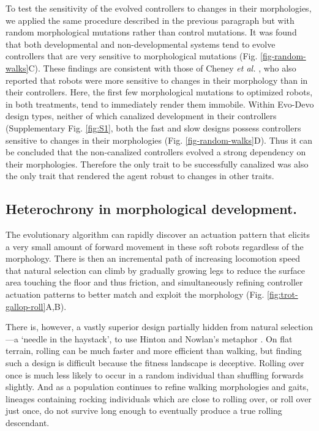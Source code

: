 To test the sensitivity of the evolved controllers to changes in their morphologies, we applied the same procedure described in the previous paragraph but with random morphological mutations rather than control mutations.
It was found that both developmental and non-developmental systems tend to evolve controllers that are very sensitive to morphological mutations (Fig. \ref{fig-random-walks}C).
These findings are consistent with those of Cheney \textit{et al.} \cite{cheney2017scalable}, who also reported that robots were more sensitive to changes in their morphology than in their controllers.
Here, the first few morphological mutations to optimized robots, in both treatments, tend to immediately render them immobile.
Within Evo-Devo design types, neither of which canalized development in their controllers (Supplementary Fig. \ref{fig:S1},%
both the fast and slow designs possess controllers sensitive to changes in their morphologies (Fig. \ref{fig-random-walks}D).
Thus it can be concluded that the non-canalized controllers evolved a strong dependency on their morphologies. 
Therefore the only trait to be successfully canalized was also the only trait that rendered the agent robust to changes in other traits.



\subsection*{Heterochrony in morphological development.}


The evolutionary algorithm can rapidly discover an actuation pattern that elicits a very small amount of forward movement in these soft robots regardless of the morphology. 
There is then an incremental path of increasing locomotion speed that natural selection can climb by gradually growing legs to reduce the surface area touching the floor and thus friction, and simultaneously refining controller actuation patterns to better match and exploit the morphology (Fig. \ref{fig:trot-gallop-roll}A,B).


There is, however, a vastly superior design partially hidden from natural selection---a `needle in the haystack', to use Hinton and Nowlan's metaphor \cite{hinton1987learning}.
On flat terrain, rolling can be much faster and more efficient than walking, but finding such a design is difficult because the fitness landscape is deceptive.
Rolling over once is much less likely to occur in a random individual than shuffling forwards slightly. And as a population continues to refine walking morphologies and gaits, lineages containing rocking individuals which are close to rolling over, or roll over just once, do not survive long enough to eventually produce a true rolling descendant. 

